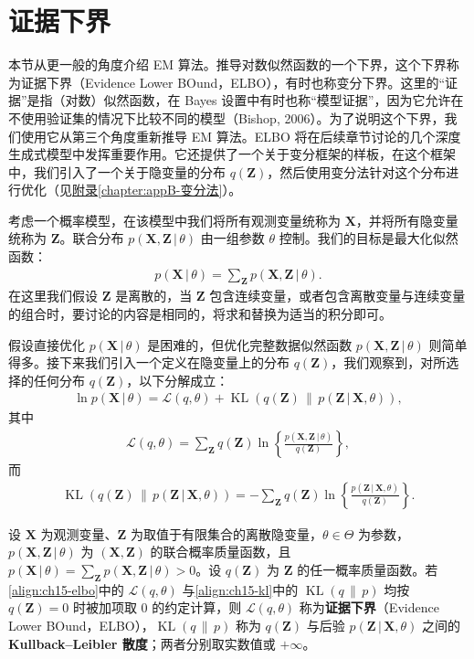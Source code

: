 \documentclass[../../main.tex]{subfiles}
\begin{document}
\section{证据下界}\label{section:ch15-证据下界}

本节从更一般的角度介绍 EM 算法。推导对数似然函数的一个下界，这个下界称为证据下界（Evidence Lower BOund，ELBO），有时也称变分下界。这里的“证据”是指（对数）似然函数，在 Bayes 设置中有时也称“模型证据”，因为它允许在不使用验证集的情况下比较不同的模型（Bishop, 2006）。为了说明这个下界，我们使用它从第三个角度重新推导 EM 算法。ELBO 将在后续章节讨论的几个深度生成式模型中发挥重要作用。它还提供了一个关于变分框架的样板，在这个框架中，我们引入了一个关于隐变量的分布 $q(\bm{Z})$，然后使用变分法针对这个分布进行优化（见\hyperref[chapter:appB-变分法]{附录\ref*{chapter:appB-变分法}}）。

考虑一个概率模型，在该模型中我们将所有观测变量统称为 $\bm{X}$，并将所有隐变量统称为 $\bm{Z}$。联合分布 $p(\bm{X},\bm{Z}\,|\,\theta)$ 由一组参数 $\theta$ 控制。我们的目标是最大化似然函数：
\begin{align}
p(\bm{X}\,|\,\theta)=\sum_{\bm{Z}}p(\bm{X},\bm{Z}\,|\,\theta).
\label{align:ch15-evidence}
\end{align}
在这里我们假设 $\bm{Z}$ 是离散的，当 $\bm{Z}$ 包含连续变量，或者包含离散变量与连续变量的组合时，要讨论的内容是相同的，将求和替换为适当的积分即可。

假设直接优化 $p(\bm{X}\,|\,\theta)$ 是困难的，但优化完整数据似然函数 $p(\bm{X},\bm{Z}\,|\,\theta)$ 则简单得多。接下来我们引入一个定义在隐变量上的分布 $q(\bm{Z})$，我们观察到，对所选择的任何分布 $q(\bm{Z})$，以下分解成立：
\begin{align}
\ln p(\bm{X}\,|\,\theta)=\mathcal{L}(q,\theta)+\operatorname{KL}\!\left(q(\bm{Z})\,\|\,p(\bm{Z}\,|\,\bm{X},\theta)\right),
\label{align:ch15-elbo-decomp}
\end{align}
其中
\begin{align}
\mathcal{L}(q,\theta)=\sum_{\bm{Z}}q(\bm{Z})\ln\!\left\{\frac{p(\bm{X},\bm{Z}\,|\,\theta)}{q(\bm{Z})}\right\},
\label{align:ch15-elbo}
\end{align}
而
\begin{align}
\operatorname{KL}\!\left(q(\bm{Z})\,\|\,p(\bm{Z}\,|\,\bm{X},\theta)\right)=-\sum_{\bm{Z}}q(\bm{Z})\ln\!\left\{\frac{p(\bm{Z}\,|\,\bm{X},\theta)}{q(\bm{Z})}\right\}.
\label{align:ch15-kl}
\end{align}

\begin{definition}\label{definition:ch15-证据下界}
设 $\bm{X}$ 为观测变量、$\bm{Z}$ 为取值于有限集合的离散隐变量，$\theta\in\Theta$ 为参数，$p(\bm{X},\bm{Z}\,|\,\theta)$ 为 $(\bm{X},\bm{Z})$ 的联合概率质量函数，且 $p(\bm{X}\,|\,\theta)=\sum_{\bm{Z}}p(\bm{X},\bm{Z}\,|\,\theta)>0$。设 $q(\bm{Z})$ 为 $\bm{Z}$ 的任一概率质量函数。若\eqref{align:ch15-elbo}中的 $\mathcal{L}(q,\theta)$ 与\eqref{align:ch15-kl}中的 $\operatorname{KL}(q\,\|\,p)$ 均按 $q(\bm{Z})=0$ 时被加项取 $0$ 的约定计算，则 $\mathcal{L}(q,\theta)$ 称为\textbf{证据下界}（Evidence Lower BOund，ELBO），$\operatorname{KL}(q\,\|\,p)$ 称为 $q(\bm{Z})$ 与后验 $p(\bm{Z}\,|\,\bm{X},\theta)$ 之间的\textbf{Kullback--Leibler 散度}；两者分别取实数值或 $+\infty$。
\end{definition}
\end{document}
